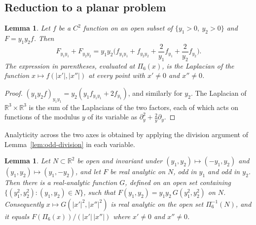 \documentclass[11pt]{amsart}
\newtheorem{lemma}[theorem]{Lemma}
\theoremstyle{definition}
\theoremstyle{remark}
\numberwithin{equation}{section}
\newcommand{\R}{\mathbb{R}}
\begin{document}
\subsection{Reduction to a planar problem}

\begin{lemma}\label{lem:laplace6}
Let $f$ be a $C^2$ function on an open subset of $\{y_1>0,\ y_2>0\}$ and $F=y_1y_2f$. Then
\[
F_{y_1y_1}+F_{y_2y_2}=y_1y_2\Big(f_{y_1y_1}+f_{y_2y_2}+\frac2{y_1}f_{y_1}+\frac2{y_2}f_{y_2}\Big).
\]
The expression in parentheses, evaluated at $\Pi_6(x)$, is the Laplacian of the function $x\mapsto f(|x'|,|x''|)$ at every point with $x'\neq0$ and $x''\neq0$.
\end{lemma}

\begin{proof}
$(y_1y_2f)_{y_1y_1}=y_2(y_1f_{y_1y_1}+2f_{y_1})$, and similarly for $y_2$. The Laplacian of $\R^3\times\R^3$ is the sum of the Laplacians of the two factors, each of which acts on functions of the modulus $y$ of its variable as $\partial_y^2+\frac2y\partial_y$.
\end{proof}

Analyticity across the two axes is obtained by applying the division argument of Lemma~\ref{lem:odd-division} in each variable.

\begin{lemma}\label{lem:odd-division6}
Let $N\subset\R^2$ be open and invariant under $(y_1,y_2)\mapsto(-y_1,y_2)$ and $(y_1,y_2)\mapsto(y_1,-y_2)$, and let $F$ be real analytic on $N$, odd in $y_1$ and odd in $y_2$. Then there is a real-analytic function $G$, defined on an open set containing $\{(y_1^2,y_2^2):(y_1,y_2)\in N\}$, such that $F(y_1,y_2)=y_1y_2\,G(y_1^2,y_2^2)$ on $N$. Consequently $x\mapsto G(|x'|^2,|x''|^2)$ is real analytic on the open set $\Pi_6^{-1}(N)$, and it equals $F(\Pi_6(x))/(|x'|\,|x''|)$ where $x'\neq0$ and $x''\neq0$.
\end{lemma}
\end{document}
